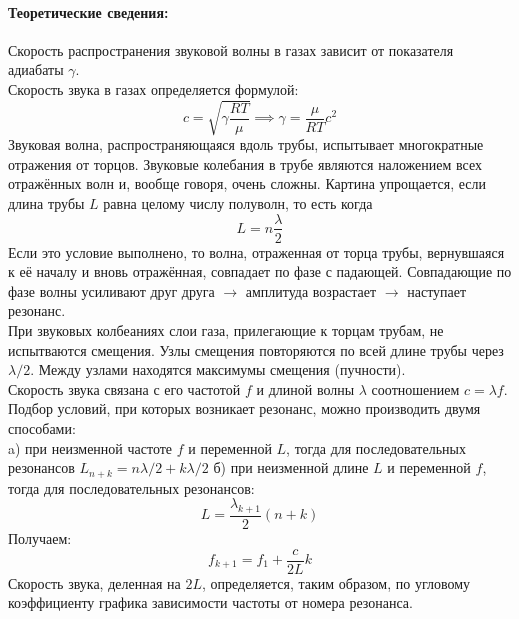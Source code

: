 \documentclass[a4paper]{article}
\begin{document}
	\paragraph{Теоретические сведения:}
	Скорость распространения звуковой волны в газах зависит от показателя адиабаты $\gamma$.\\
	Скорость звука в газах определяется формулой:
	\begin{equation}
 	c=\sqrt{\gamma \frac{RT}{\mu}} \implies \gamma=\frac{\mu}{RT}c^2	
	\end{equation}	
	Звуковая волна, распространяющаяся вдоль трубы, испытывает многократные отражения от торцов. Звуковые колебания в трубе являются наложением всех отражённых волн и, вообще говоря, очень сложны. Картина упрощается, если длина трубы $L$ равна целому числу полуволн, то есть когда
	\begin{equation}
	L=n\frac{\lambda}{2}
	\end{equation}
	Если это условие выполнено, то волна, отраженная от торца трубы, вернувшаяся к её началу и вновь отражённая, совпадает по фазе с падающей. Совпадающие по фазе волны усиливают друг друга $\rightarrow$ амплитуда возрастает $\rightarrow$ наступает резонанс.\\
	При звуковых колбеаниях слои газа, прилегающие к торцам трубам, не испытваются смещения. Узлы смещения повторяются по всей длине трубы через $\lambda/2$. Между узлами находятся максимумы смещения (пучности). \\
	Скорость звука связана с его частотой $f$ и длиной волны $\lambda$ соотношением $c=\lambda f$.\\
	Подбор условий, при которых возникает резонанс, можно производить двумя способами: \\ 
	a) при неизменной частоте $f$ и переменной $L$, тогда для последовательных резонансов $L_{n+k}=n\lambda / 2 + k\lambda / 2$
	б) при неизменной длине $L$ и переменной $f$, тогда для последовательных резонансов:
	\begin{equation}
	L=\frac{\lambda _{k+1}}{2}(n+k)
	\end{equation}
	Получаем:
	\begin{equation}
	f_{k+1}=f_1 + \frac{c}{2L}k
	\end{equation}
	Скорость звука, деленная на $2L$, определяется, таким образом, по угловому коэффициенту графика зависимости частоты от номера резонанса.
\end{document}
